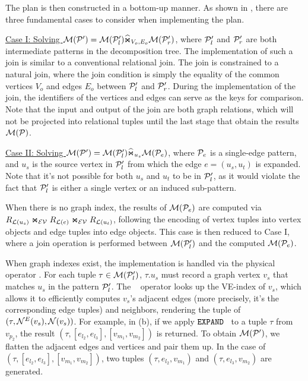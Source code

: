 The plan is then constructed in a bottom-up manner. As shown in , there are three fundamental cases to consider when implementing the plan.

\underline{Case I: Solving $\mathcal{M}(\mathcal{P}') = \mathcal{M}(\mathcal{P}'_l) \widehat{\Join}_{V_o, E_o} \mathcal{M}(\mathcal{P}'_r)$}, where $\mathcal{P}_l'$ and $\mathcal{P}'_r$ are both intermediate patterns in the decomposition tree. The implementation of such a join is similar to a conventional relational join. The join is constrained to a natural join, where the join condition is simply the equality of the common vertices $V_o$ and edges $E_o$ between $\mathcal{P}_l'$ and $\mathcal{P}_r'$. During the implementation of the join, the identifiers of the vertices and edges can serve as the keys for comparison. Note that the input and output of the join are both graph relations, which will not
be projected into relational tuples until the last stage that obtain the results $\mathcal{M}(\mathcal{P})$.

\underline{Case II: Solving $\mathcal{M}(\mathcal{P}') = \mathcal{M}(\mathcal{P}'_l) \widehat{\Join}_{u_s} \mathcal{M}(\mathcal{P}_e)$}, where $\mathcal{P}_e$ is a single-edge pattern, and $u_s$ is the source vertex in $\mathcal{P}'_l$ from which the edge $e = (u_s, u_t)$ is expanded. Note that it's not possible for both $u_s$ and $u_t$ to be in $\mathcal{P}'_l$, as it would violate the fact that $\mathcal{P}'_l$ is either a single vertex or an induced sub-pattern.

When there is no graph index, the results of $\mathcal{M}(\mathcal{P}_e)$ are computed via $R_{\mathcal{L}(u_s)} \Join_\mathcal{EV} R_{\mathcal{L}(e)} \Join_\mathcal{EV} R_{\mathcal{L}(u_t)}$, following the encoding of vertex tuples into vertex objects and edge tuples into edge objects.
This case is then reduced to Case I, where a join operation is performed between $\mathcal{M}(\mathcal{P}'_l)$ and the computed $\mathcal{M}(\mathcal{P}_e)$.

When graph indexes exist, the implementation is handled via the physical operator . For each tuple $\tau \in \mathcal{M}(\mathcal{P}'_l)$, $\tau.u_s$ must record a graph vertex $v_s$ that matches $u_s$ in the pattern $\mathcal{P}'_l$. The \expand~ operator looks up the VE-index of $v_s$, which allows it to efficiently computes $v_s$'s adjacent edges (more precisely, it's the corresponding edge tuples) and neighbors, rendering the tuple of $(\tau, {\mathcal{N}}^E(v_s), {\mathcal{N}}(v_s))$. For example, in (b), if we apply ${\texttt{EXPAND}}$~ to a tuple $\tau$ from $v_{p_2}$, the result $(\tau, [e_{l_2}, e_{l_3}], [v_{m_1}, v_{m_2}])$ is returned.
To obtain $\mathcal{M}(\mathcal{P}')$, we flatten the adjacent edges and vertices and pair them up. In the case of $(\tau, [e_{l_2}, e_{l_3}], [v_{m_1}, v_{m_2}])$, two tuples $(\tau, e_{l_2}, v_{m_1})$ and $(\tau, e_{l_3}, v_{m_2})$ are generated.


